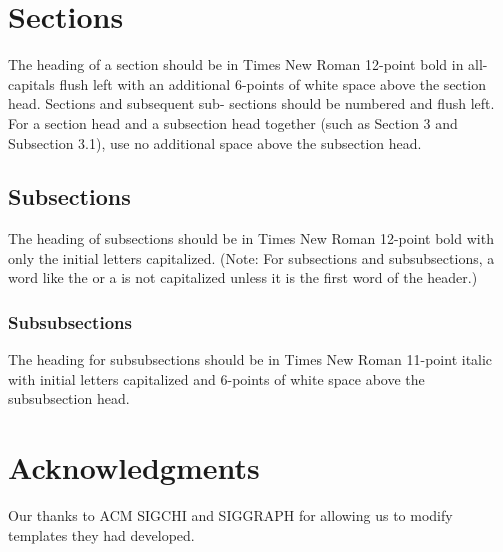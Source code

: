 \documentclass[twoside,twocolumn,10pt]{article}
\begin{document}
\section{Sections}
The heading of a section should be in Times New Roman 12-point bold in all-capitals flush left with an additional 6-points of white space above the section head.  Sections and subsequent sub- sections should be numbered and flush left. For a section head and a subsection head together (such as Section 3 and Subsection 3.1), use no additional space above the subsection head.

\subsection{Subsections}
The heading of subsections should be in Times New Roman 12-point bold with only the initial letters capitalized. (Note: For subsections and subsubsections, a word like the or a is not capitalized unless it is the first word of the header.)

\subsubsection{Subsubsections}
The heading for subsubsections should be in Times New Roman 11-point italic with initial letters capitalized and 6-points of white space above the subsubsection head.

\section{Acknowledgments}
Our thanks to ACM SIGCHI and SIGGRAPH for allowing us to modify templates they had developed.

%
%
\end{document}
